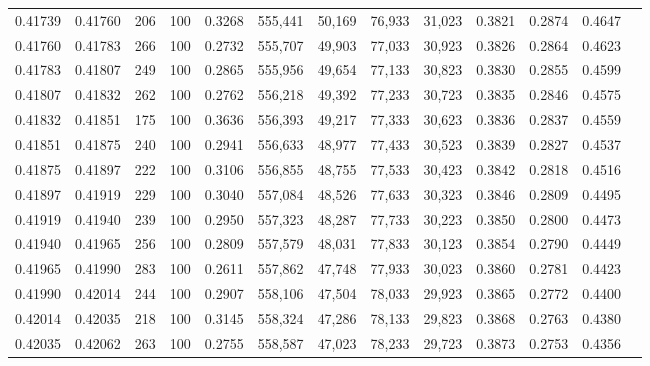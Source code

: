\begin{tabular}{rrrrrrrrrrrrr}
0.41739 & 0.41760 &   206 & 100 &                                     0.3268 & 555,441 &  50,169 &  76,933 &  31,023 & 0.3821 & 0.2874 & 0.4647 \\
0.41760 & 0.41783 &   266 & 100 &                                     0.2732 & 555,707 &  49,903 &  77,033 &  30,923 & 0.3826 & 0.2864 & 0.4623 \\
0.41783 & 0.41807 &   249 & 100 &                                     0.2865 & 555,956 &  49,654 &  77,133 &  30,823 & 0.3830 & 0.2855 & 0.4599 \\
0.41807 & 0.41832 &   262 & 100 &                                     0.2762 & 556,218 &  49,392 &  77,233 &  30,723 & 0.3835 & 0.2846 & 0.4575 \\
0.41832 & 0.41851 &   175 & 100 &                                     0.3636 & 556,393 &  49,217 &  77,333 &  30,623 & 0.3836 & 0.2837 & 0.4559 \\
0.41851 & 0.41875 &   240 & 100 &                                     0.2941 & 556,633 &  48,977 &  77,433 &  30,523 & 0.3839 & 0.2827 & 0.4537 \\
0.41875 & 0.41897 &   222 & 100 &                                     0.3106 & 556,855 &  48,755 &  77,533 &  30,423 & 0.3842 & 0.2818 & 0.4516 \\
0.41897 & 0.41919 &   229 & 100 &                                     0.3040 & 557,084 &  48,526 &  77,633 &  30,323 & 0.3846 & 0.2809 & 0.4495 \\
0.41919 & 0.41940 &   239 & 100 &                                     0.2950 & 557,323 &  48,287 &  77,733 &  30,223 & 0.3850 & 0.2800 & 0.4473 \\
0.41940 & 0.41965 &   256 & 100 &                                     0.2809 & 557,579 &  48,031 &  77,833 &  30,123 & 0.3854 & 0.2790 & 0.4449 \\
0.41965 & 0.41990 &   283 & 100 &                                     0.2611 & 557,862 &  47,748 &  77,933 &  30,023 & 0.3860 & 0.2781 & 0.4423 \\
0.41990 & 0.42014 &   244 & 100 &                                     0.2907 & 558,106 &  47,504 &  78,033 &  29,923 & 0.3865 & 0.2772 & 0.4400 \\
0.42014 & 0.42035 &   218 & 100 &                                     0.3145 & 558,324 &  47,286 &  78,133 &  29,823 & 0.3868 & 0.2763 & 0.4380 \\
0.42035 & 0.42062 &   263 & 100 &                                     0.2755 & 558,587 &  47,023 &  78,233 &  29,723 & 0.3873 & 0.2753 & 0.4356 \\

\end{tabular}

